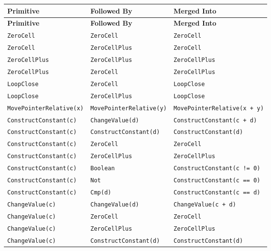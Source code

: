 \begin{longtable}{R{0.27\textwidth}|L{0.27\textwidth}|Q{0.34\textwidth}}
\hline
\textbf{Primitive} & \textbf{Followed By} & \textbf{Merged Into} \\
\hline
\endfirsthead
\hline
\textbf{Primitive} & \textbf{Followed By} & \textbf{Merged Into} \\
\hline
\endhead
\endlastfoot

\texttt{ZeroCell} & \texttt{ZeroCell} & \texttt{ZeroCell} \\
\texttt{ZeroCell} & \texttt{ZeroCellPlus} & \texttt{ZeroCell} \\
\hline

\texttt{ZeroCellPlus} & \texttt{ZeroCellPlus} & \texttt{ZeroCellPlus} \\
\texttt{ZeroCellPlus} & \texttt{ZeroCell} & \texttt{ZeroCellPlus} \\
\hline

\texttt{LoopClose} & \texttt{ZeroCell} & \texttt{LoopClose} \\
\texttt{LoopClose} & \texttt{ZeroCellPlus} & \texttt{LoopClose} \\
\hline

\texttt{MovePointerRelative(x)} & \texttt{MovePointerRelative(y)} & \texttt{MovePointerRelative(x + y)} \\
\hline

\texttt{ConstructConstant(c)} & \texttt{ChangeValue(d)} & \texttt{ConstructConstant(c + d)} \\
\texttt{ConstructConstant(c)} & \texttt{ConstructConstant(d)} & \texttt{ConstructConstant(d)} \\
\texttt{ConstructConstant(c)} & \texttt{ZeroCell} & \texttt{ZeroCell} \\
\texttt{ConstructConstant(c)} & \texttt{ZeroCellPlus} & \texttt{ZeroCellPlus} \\
\texttt{ConstructConstant(c)} & \texttt{Boolean} & \texttt{ConstructConstant(c != 0)} \\
\texttt{ConstructConstant(c)} & \texttt{Not} & \texttt{ConstructConstant(c == 0)} \\
\texttt{ConstructConstant(c)} & \texttt{Cmp(d)} & \texttt{ConstructConstant(c == d)} \\
\hline

\texttt{ChangeValue(c)} & \texttt{ChangeValue(d)} & \texttt{ChangeValue(c + d)} \\
\texttt{ChangeValue(c)} & \texttt{ZeroCell} & \texttt{ZeroCell} \\
\texttt{ChangeValue(c)} & \texttt{ZeroCellPlus} & \texttt{ZeroCellPlus} \\
\texttt{ChangeValue(c)} & \texttt{ConstructConstant(d)} & \texttt{ConstructConstant(d)} \\
\hline


\end{longtable}
